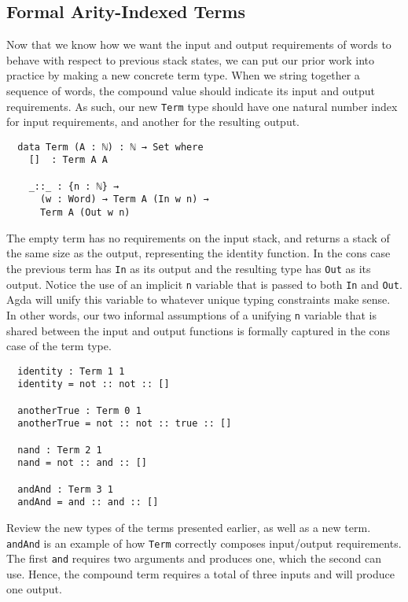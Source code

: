 \documentclass{acm_proc_article-sp}
\begin{document}
\subsection{Formal Arity-Indexed Terms}

Now that we know how we want the input and output requirements of
words to behave with respect to previous stack states, we can put our
prior work into practice by making a new concrete term type. When we
string together a sequence of words, the compound value should
indicate its input and output requirements. As such, our new
\texttt{Term} type should have one natural number index for input
requirements, and another for the resulting output.

\begin{verbatim}
  data Term (A : ℕ) : ℕ → Set where
    []  : Term A A

    _::_ : {n : ℕ} →
      (w : Word) → Term A (In w n) →
      Term A (Out w n)
\end{verbatim}

The empty term has no requirements on the input stack, and returns a
stack of the same size as the output, representing the identity
function. In the cons case the previous term has \texttt{In} as its
output and the resulting type has \texttt{Out} as its output. Notice
the use of an implicit \texttt{n} variable that is passed to both
\texttt{In} and \texttt{Out}. Agda will unify this variable to
whatever unique typing constraints make sense. In other words, our two
informal assumptions of a unifying \texttt{n} variable that is shared
between the input and output functions is formally captured in the
cons case of the term type.

\begin{verbatim}
  identity : Term 1 1
  identity = not :: not :: []

  anotherTrue : Term 0 1
  anotherTrue = not :: not :: true :: []

  nand : Term 2 1
  nand = not :: and :: []

  andAnd : Term 3 1
  andAnd = and :: and :: []
\end{verbatim}

Review the new types of the terms presented earlier, as well as a new
term. \texttt{andAnd} is an example of how \texttt{Term} correctly
composes input/output requirements. The first \texttt{and} requires
two arguments and produces one, which the second can use. Hence, the
compound term requires a total of three inputs and will produce one
output.
\end{document}
